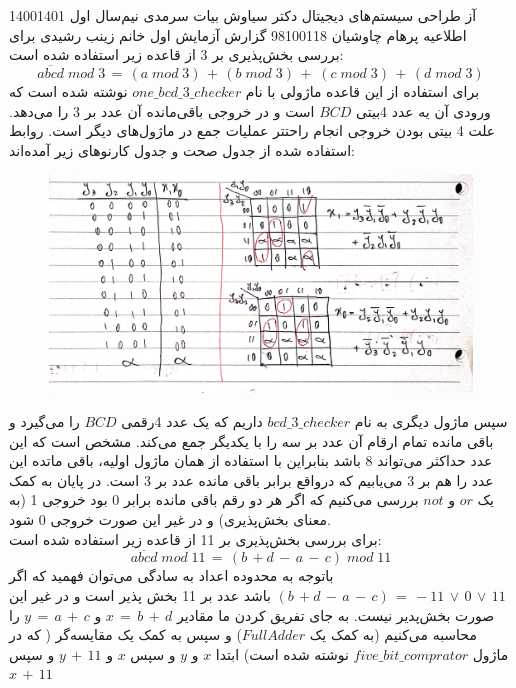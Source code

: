 \documentclass[a4paper,12pt]{article}
\begin{document}
\handout
{آز طراحی سیستم‌های دیجیتال}
{دکتر سیاوش بیات سرمدی}
{نیم‌سال اول 1400\lr{-}1401}
{اطلاعیه}
{پرهام چاوشیان}
{98100118}
 {گزارش آزمایش اول}
{خانم زینب رشیدی}
برای بررسی بخش‌پذیری بر 3 از قاعده زیر استفاده شده است:
\begin{equation*}
\overline{abcd}\;mod\;3\,=\,(a\;mod\;3)\,+\,(b\;mod\;3)\,+\;(c\;mod\;3)\,+\,(d\;mod\;3)
\end{equation*}
برای استفاده از این قاعده ماژولی با نام
$one\_bcd\_3\_checker$
نوشته شده است که ورودی آن یه عدد 4بیتی $BCD$ است و در خروجی باقی‌مانده آن عدد بر 3 را می‌دهد. علت 4 بیتی بودن خروجی انجام راحتتر عملیات جمع در ماژول‌های دیگر است. روابط استفاده شده از جدول صحت و جدول کارنوهای زیر آمده‌اند:\\
\begin{figure}[H]
 \centering
  \includegraphics[width=0.8\linewidth]{karno}
\end{figure}
سپس ماژول دیگری به نام
$bcd\_3\_checker$
داریم که یک عدد 4رقمی $BCD$ را می‌گیرد و باقی مانده تمام ارقام آن عدد بر سه را با یکدیگر جمع می‌کند. مشخص است که این عدد حداکثر می‌تواند 8 باشد بنابراین با استفاده از همان ماژول اولیه، باقی ماتده این عدد را هم بر 3 می‌یابیم که درواقع برابر باقی مانده عدد بر 3 است. در پایان به کمک یک $or$ و $not$ بررسی می‌کنیم که اگر هر دو رقم باقی مانده برابر 0 بود خروجی 1 (به معنای بخش‌پذیری) و در غیر این صورت خروجی 0 شود.\\
برای بررسی بخش‌پذیری بر 11 از قاعده زیر استفاده شده است:
\begin{equation*}
\overline{abcd}\;mod\;11\,=\, (b\,+d\,-\,a\,-\,c)\; mod\;11
\end{equation*}
باتوجه به محدوده اعداد به سادگی می‌توان فهمید که اگر
$(b\,+d\,-\,a\,-\,c)\,=\,-11\,\vee \,0\,\vee \,11$
باشد عدد بر 11 بخش پذیر است و در غیر این صورت بخش‌پدیر نیست. به جای تفریق کردن ما مقادیر
$x\,=\,b\,+\,d$
و
$y\,=\,a\,+\,c$
را محاسبه می‌کنیم (به کمک یک $FullAdder$) و سپس به کمک یک مقایسه‌گر ( که در ماژول $five\_bit\_comprator$ نوشته شده است) ابتدا $x$ و $y$ و سپس $x$ و $y\,+\,11$ و سپس
$x\,+\,11$
\end{document}
